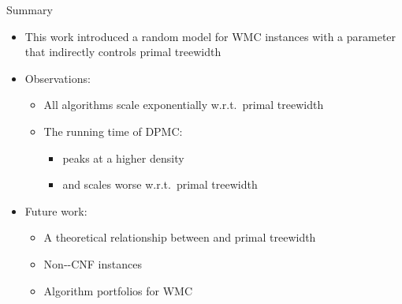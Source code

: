 \documentclass{beamer}
\begin{document}
\begin{frame}{Summary}
  \begin{itemize}
    \item This work introduced a \alert{random model} for WMC instances with a
          parameter that indirectly controls \alert{primal treewidth}
    \item Observations:
    \begin{itemize}
      \item All algorithms \alert{scale exponentially} w.r.t.\ primal treewidth
      \item The running time of \textsc{DPMC}:
      \begin{itemize}
        \item peaks at a higher density
        \item and scales worse w.r.t.\ primal treewidth
      \end{itemize}
    \end{itemize}
    \item Future work:
    \begin{itemize}
      \item A theoretical relationship between \structure{$\rho$} and primal treewidth
      \item Non--CNF instances
      \item Algorithm portfolios for WMC
    \end{itemize}
  \end{itemize}
\end{frame}
\end{document}
